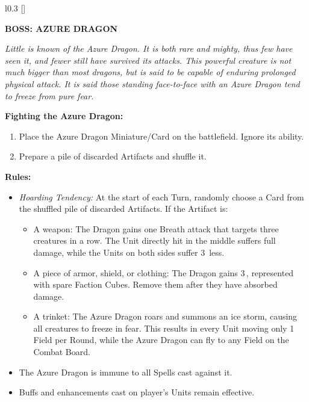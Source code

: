 \begin{wrapfigure}{l}{0.3\textwidth}
  \raisebox{0pt}[\dimexpr{}\baselineskip\relax]{}
\end{wrapfigure}
{
  \textbf{\MakeUppercase{Boss: Azure Dragon}}

  \medskip

  \textit{Little is known of the Azure Dragon.
    It is both rare and mighty, thus few have seen it, and fewer still have survived its attacks.
    This powerful creature is not much bigger than most dragons, but is said to be capable of enduring prolonged physical attack.
    It is said those standing face-to-face with an Azure Dragon tend to freeze from pure fear.
  }

  \medskip

  \textbf{Fighting the Azure Dragon:}
  \begin{enumerate}
    \item Place the Azure Dragon Miniature/Card on the battlefield.
      Ignore its ability.
    \item Prepare a pile of discarded Artifacts and shuffle it.
  \end{enumerate}

  \medskip

  \textbf{Rules:}
  \begin{itemize}
    \item \textit{Hoarding Tendency:} At the start of each Turn, randomly choose a Card from the shuffled pile of discarded Artifacts.
      If the Artifact is:
      \begin{itemize}
        \item A weapon: The Dragon gains one Breath attack that targets three creatures in a row.
          The Unit directly hit in the middle suffers full damage, while the Units on both sides suffer 3\, less.
        \item A piece of armor, shield, or clothing: The Dragon gains 3\,, represented with spare Faction Cubes.
          Remove them after they have absorbed damage.
        \item A trinket: The Azure Dragon roars and summons an ice storm, causing all creatures to freeze in fear.
          This results in every Unit moving only 1 Field per Round, while the Azure Dragon can fly to any Field on the Combat Board.
      \end{itemize}
    \item The Azure Dragon is immune to all Spells cast against it.
    \item Buffs and enhancements cast on player's Units remain effective.
  \end{itemize}
}

